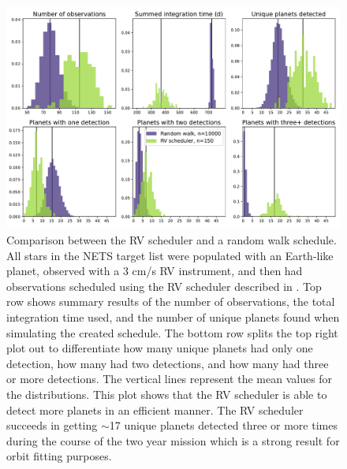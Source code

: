 \begin{figure}
  \begin{center}
    \includegraphics[width=1\textwidth]{ch4/figures/final_results.pdf}
  \end{center}
  \caption{Comparison between the RV scheduler and a random walk schedule.
  All stars in the NETS target list were populated with an Earth-like planet,
  observed with a 3 cm/s RV instrument, and then had observations scheduled
  using the RV scheduler described in . Top row shows
  summary results of the number of observations, the total integration time
used, and the number of unique planets found when simulating the created
schedule. The bottom row splits the top right plot out to differentiate how
many unique planets had only one detection, how many had two detections, and
how many had three or more detections. The vertical lines represent the mean values
for the distributions. This plot shows that the RV scheduler is able to detect
more planets in an efficient manner. The RV scheduler succeeds in getting $\sim$17
unique planets detected three or more times during the course of the two year
mission which is a strong result for orbit fitting purposes.}
  \label{fig:randomwalkhist}
\end{figure}

